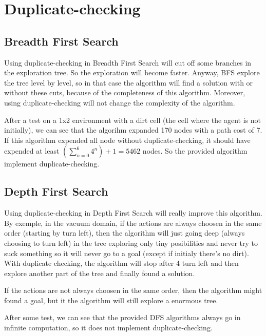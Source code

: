 \section{Duplicate-checking}
  \subsection{Breadth First Search}
Using duplicate-checking in Breadth First Search will cut off some branches in the exploration tree. So the exploration will become faster. Anyway, BFS explore the tree level by level, so in that case the algorithm will find a solution with or without these cuts, because of the completeness of this algorithm. Moreover, using duplicate-checking will not change the complexity of the algorithm.

After a test on a 1x2 environment with a dirt cell (the cell where the agent is not initially), we can see that the algorihm expanded 170 nodes with a path cost of 7. If this algorithm expended all node without duplicate-checking, it should have expended at least $(\sum_{n=0}^{6} 4^n) + 1 = 5462$ nodes. So the provided algorithm implement duplicate-checking.

  \subsection{Depth First Search}
Using duplicate-checking in Depth First Search will really improve this algorithm. By exemple, in the vacuum domain, if the actions are always choosen in the same order (starting by turn left), then the algorithm will just going deep (always choosing to turn left) in the tree exploring only tiny posibilities and never try to suck something so it will never go to a goal (except if initialy there's no dirt). With duplicate checking, the algorithm will stop after 4 turn left and then explore another part of the tree and finally found a solution.

If the actions are not always choosen in the same order, then the algorithm might found a goal, but it the algorithm will still explore a enormous tree.

After some test, we can see that the provided DFS algorithms always go in infinite computation, so it does not implement duplicate-checking.

